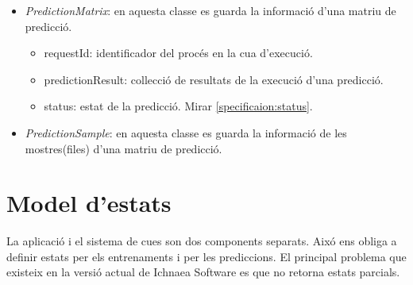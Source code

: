 \begin{itemize}
\item \textit{PredictionMatrix}: en aquesta classe es guarda la informaci\'{o} d'una matriu de predicci\'{o}.
\begin{itemize}
\item requestId: identificador del proc\'{e}s en la cua d'execuci\'{o}.
\item predictionResult: collecci\'{o} de resultats de la execuci\'{o} d'una predicci\'{o}.
\item status: estat de la predicci\'{o}. Mirar \ref{specificaion:status}.
\end{itemize}

\item \textit{PredictionSample}: en aquesta classe es guarda la informaci\'{o} de les mostres(files) d'una matriu de predicci\'{o}.

\end{itemize}

\section{Model d'estats}
\label{sec:status}
La aplicaci\'{o} i el sistema de cues son dos components separats. Aix\'{o} ens obliga a definir estats per els entrenaments i per les prediccions. El principal problema que existeix en la versi\'{o} actual de Ichnaea Software es que no retorna estats parcials.

